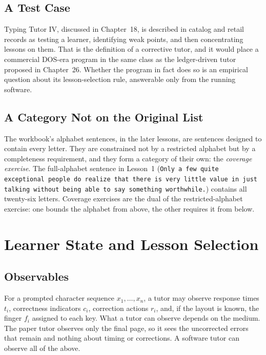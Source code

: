 \section{A Test Case}

Typing Tutor IV, discussed in Chapter~18, is described in catalog and retail records as testing a learner, identifying weak points, and then concentrating lessons on them. That is the definition of a corrective tutor, and it would place a commercial DOS-era program in the same class as the ledger-driven tutor proposed in Chapter~26. Whether the program in fact does so is an empirical question about its lesson-selection rule, answerable only from the running software.

\section{A Category Not on the Original List}

The workbook's alphabet sentences, in the later lessons, are sentences designed to contain every letter. They are constrained not by a restricted alphabet but by a completeness requirement, and they form a category of their own: the \emph{coverage exercise}. The full-alphabet sentence in Lesson~1 (\texttt{Only a few quite exceptional people do realize that there is very little value in just talking without being able to say something worthwhile.}) contains all twenty-six letters. Coverage exercises are the dual of the restricted-alphabet exercise: one bounds the alphabet from above, the other requires it from below.

\chapter{Learner State and Lesson Selection}

\section{Observables}

For a prompted character sequence $x_1,\dots,x_n$, a tutor may observe response times $t_i$, correctness indicators $c_i$, correction actions $r_i$, and, if the layout is known, the finger $f_i$ assigned to each key. What a tutor can observe depends on the medium. The paper tutor observes only the final page, so it sees the uncorrected errors that remain and nothing about timing or corrections. A software tutor can observe all of the above.

